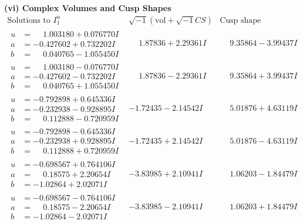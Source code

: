 \documentclass[1p]{elsarticle_modified}
\theoremstyle{definition}
\newcommand{\I}{\sqrt{-1}}
\begin{document}
\newpage\flushleft \textbf{(vi) Complex Volumes and Cusp Shapes}
$$\begin{array}{c|c|c}  
\text{Solutions to }I^u_{1}& \I (\text{vol} + \sqrt{-1}CS) & \text{Cusp shape}\\
 \hline 
\begin{aligned}
u &= \phantom{-}1.003180 + 0.076770 I \\
a &= -0.427602 + 0.732202 I \\
b &= \phantom{-}0.040765 - 1.055450 I\end{aligned}
 & \phantom{-}1.87836 + 2.29361 I & \phantom{-}9.35864 - 3.99437 I \\ \hline\begin{aligned}
u &= \phantom{-}1.003180 - 0.076770 I \\
a &= -0.427602 - 0.732202 I \\
b &= \phantom{-}0.040765 + 1.055450 I\end{aligned}
 & \phantom{-}1.87836 - 2.29361 I & \phantom{-}9.35864 + 3.99437 I \\ \hline\begin{aligned}
u &= -0.792898 + 0.645336 I \\
a &= -0.232938 - 0.928895 I \\
b &= \phantom{-}0.112888 - 0.720959 I\end{aligned}
 & -1.72435 - 2.14542 I & \phantom{-}5.01876 + 4.63119 I \\ \hline\begin{aligned}
u &= -0.792898 - 0.645336 I \\
a &= -0.232938 + 0.928895 I \\
b &= \phantom{-}0.112888 + 0.720959 I\end{aligned}
 & -1.72435 + 2.14542 I & \phantom{-}5.01876 - 4.63119 I \\ \hline\begin{aligned}
u &= -0.698567 + 0.764106 I \\
a &= \phantom{-}0.18575 + 2.20654 I \\
b &= -1.02864 + 2.02071 I\end{aligned}
 & -3.83985 + 2.10941 I & \phantom{-}1.06203 - 1.84479 I \\ \hline\begin{aligned}
u &= -0.698567 - 0.764106 I \\
a &= \phantom{-}0.18575 - 2.20654 I \\
b &= -1.02864 - 2.02071 I\end{aligned}
 & -3.83985 - 2.10941 I & \phantom{-}1.06203 + 1.84479 I \\ \hline\begin{aligned}

\end{aligned}
\end{array}$$
\end{document}
